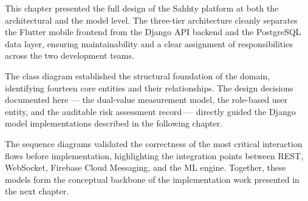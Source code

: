 This chapter presented the full design of the Sahhty platform at both the architectural and the model level. The three-tier architecture cleanly separates the Flutter mobile frontend from the Django API backend and the PostgreSQL data layer, ensuring maintainability and a clear assignment of responsibilities across the two development teams.

The class diagram established the structural foundation of the domain, identifying fourteen core entities and their relationships. The design decisions documented here --- the dual-value measurement model, the role-based user entity, and the auditable risk assessment record --- directly guided the Django model implementations described in the following chapter.

The sequence diagrams validated the correctness of the most critical interaction flows before implementation, highlighting the integration points between REST, WebSocket, Firebase Cloud Messaging, and the ML engine. Together, these models form the conceptual backbone of the implementation work presented in the next chapter.

